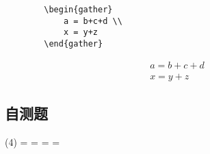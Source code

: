\documentclass{article}
\begin{document}
    \begin{verbatim}
        \begin{gather}
            a = b+c+d \\
            x = y+z
        \end{gather}\end{verbatim}
        \begin{gather}
          a = b+c+d \\
          x = y+z
        \end{gather}
    \epics

  \subsection{自测题}
    \begin{tasks}(4)
      \task \N=
      \task \Q=
      \task \R=
      \task \Z=
    \end{tasks}
\end{document}
